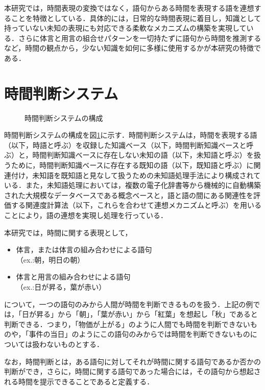 本研究では，時間表現の変換ではなく，語句からある時間を表現する語を連想することを特徴としている．具体的には，日常的な時間表現に着目し，知識として持っていない未知の表現にも対応できる柔軟なメカニズムの構築を実現している．さらに体言と用言の組合せパターンを一切持たずに語句から時間を推測するなど，時間の観点から，少ない知識を如何に多様に使用するかが本研究の特徴である．


\section{時間判断システム}\label{time}

\begin{figure}[b]
\caption{時間判断システムの構成}
\label{time-judgment-system}
\end{figure}

時間判断システムの構成を図\ref{time-judgment-system}に示す．時間判断システムは，時間を表現する語（以下，時語と呼ぶ）を収録した知識ベース（以下，時間判断知識ベースと呼ぶ）と，時間判断知識ベースに存在しない未知の語（以下，未知語と呼ぶ）を扱うために，時間判断知識ベースに存在する既知の語（以下，既知語と呼ぶ）に関連付け，未知語を既知語と見なして扱うための未知語処理手法により構成されている．また，未知語処理においては，複数の電子化辞書等から機械的に自動構築された大規模なデータベースである概念ベース\cite{hirose:02,kojima:02}と，語と語の間にある関連性を評価する関連度計算法\cite{watabe:01}（以下，これらを合わせて連想メカニズムと呼ぶ）を用いることにより，語の連想を実現し処理を行っている．

本研究では，時間に関する表現として，

\begin{itemize}
\item 体言，または体言の組み合わせによる語句\\
（ex.:朝，明日の朝）

\item 体言と用言の組み合わせによる語句\\
（ex.:日が昇る，葉が赤い）
\end{itemize}
について，一つの語句のみから人間が時間を判断できるものを扱う．上記の例では，「日が昇る」から「朝」，「葉が赤い」から「紅葉」を想起し「秋」であると判断できる．つまり，「物価が上がる」のように人間でも時間を判断できないものや，「事件の当日」のようにこの語句のみからでは時間を判断できないものについては扱わないものとする．

なお，時間判断とは，ある語句に対してそれが時間に関する語句であるか否かの判断ができ，さらに，時間に関する語句であった場合には，その語句から想起される時間を提示できることであると定義する．

